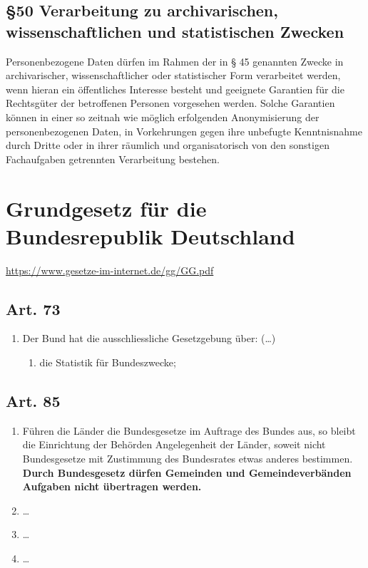 \documentclass[A4, 12pt]{scrbook}
\begin{document}
    \section[\S 50 Verarbeitung zu \dots statistischen Zwecken]{\S 50 Verarbeitung zu archivarischen, wissenschaftlichen  und statistischen Zwecken}
    Personenbezogene Daten dürfen im Rahmen der in § 45 genannten Zwecke in archivarischer, wissenschaftlicher oder statistischer Form verarbeitet werden, wenn hieran ein öffentliches Interesse besteht und geeignete Garantien für die Rechtsgüter der betroffenen Personen vorgesehen werden. Solche Garantien können in einer so zeitnah wie möglich erfolgenden Anonymisierung der personenbezogenen Daten, in Vorkehrungen gegen ihre unbefugte Kenntnisnahme durch Dritte oder in ihrer räumlich und organisatorisch von den sonstigen Fachaufgaben getrennten Verarbeitung bestehen.
    
\chapter[GG]{Grundgesetz für die Bundesrepublik Deutschland}
\newline
\url{https://www.gesetze-im-internet.de/gg/GG.pdf}
    \section{Art. 73}
        \begin{enumerate}[label=(\arabic*)]
            \item Der Bund hat die ausschliessliche Gesetzgebung über:
            \newline
            (\dots)
                \begin{enumerate}[label=\arabic*.,start=11]
                    \item  die Statistik für Bundeszwecke;
                \end{enumerate}

            
        \end{enumerate}
    \section{Art. 85}
        \begin{enumerate}[label=(\arabic*)]
            \item Führen die Länder die Bundesgesetze im Auftrage des Bundes aus, so bleibt die Einrichtung der Behörden Angelegenheit der Länder, soweit nicht Bundesgesetze mit Zustimmung des Bundesrates etwas anderes bestimmen. \textbf{Durch Bundesgesetz dürfen Gemeinden und Gemeindeverbänden Aufgaben nicht übertragen werden.}
            \item \dots
            \item \dots
            \item \dots
        \end{enumerate}
\end{document}
